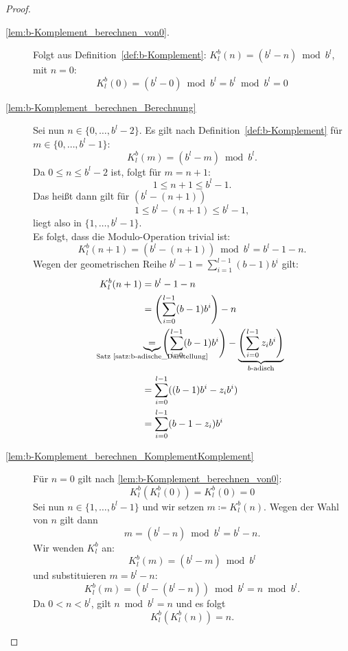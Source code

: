\documentclass{article}
\begin{document}
    \begin{proof}
      \begin{description}
        \item[\ref{lem:b-Komplement_berechnen_von0}.] Folgt aus Definition~\ref{def:b-Komplement}: $K_l^b(n) = (b^l-n) \bmod b^l$, mit $n=0$:
          \[K_l^b(0)=(b^l-0) \bmod b^l = b^l \bmod b^l = 0\]
        \item[\ref{lem:b-Komplement_berechnen_Berechnung}] Sei nun $n \in \{0,\dots,b^l-2\}$.
          Es gilt nach Definition~\ref{def:b-Komplement} für $m \in \{0, \dots, b^l-1\}:$ 
          \[K^b_l(m)=(b^l-m) \bmod b^l.\]
          Da $0 \leq n \leq b^l -2$ ist, folgt für $m = n+1$:
          \[1 \leq n+1 \leq b^l-1.\]
          Das heißt dann gilt für $(b^l - (n+1))$ 
          \[1 \leq b^l-(n+1) \leq b^l -1,\] 
          liegt also in $\{1, \dots, b^l-1\}$.\\
          Es folgt, dass die Modulo-Operation trivial ist:
          \[K^b_l(n+1)=(b^l-(n+1)) \bmod b^l =b^l-1-n.\]
          Wegen der geometrischen Reihe $b^l-1 = \displaystyle\sum_{i=1}^{l-1} (b-1)b^i$ gilt:
          \begin{align*}
            K^b_l(n+1) &= b^l-1-n \\
            &= \left(\sum_{i=0}^{l-1}(b-1)b^i\right) -n \\
            &\underbrace{=}_{\mathclap{\text{Satz \ref{satz:b-adische_Darstellung}}}} \left(\sum_{i=0}^{l-1}(b-1)b^i\right) - \underbrace{\left(\sum_{i=0}^{l-1} z_ib^i\right)}_{\mathclap{b\text{-adisch}}} \\
            &= \sum_{i=0}^{l-1} ((b-1)b^i - z_ib^i) \\
            &= \sum_{i=0}^{l-1} (b-1-z_i) b^i
          \end{align*}
        \item[\ref{lem:b-Komplement_berechnen_KomplementKomplement}] Für $n=0$ gilt nach \ref{lem:b-Komplement_berechnen_von0}: 
          \[K^b_l(K^b_l(0)) = K^b_l(0) = 0\]
          Sei nun $n \in \{1, \dots, b^l-1\}$ und wir setzen $m \coloneq K_l^b(n)$.
          Wegen der Wahl von $n$ gilt dann 
          \[m = (b^l-n) \bmod b^l = b^l-n.\]
          Wir wenden $K_l^b$ an:
          \[K_l^b(m) = (b^l-m) \bmod b^l\]
          und substituieren $m=b^l-n$:
          \[K_l^b(m)=(b^l-(b^l-n)) \bmod b^l = n \bmod b^l.\]
          Da $0 < n < b^l$, gilt $n \bmod b^l = n$ und es folgt
          \[K^b_l(K^b_l(n))=n.\]
      \end{description}
    \end{proof}
\end{document}
